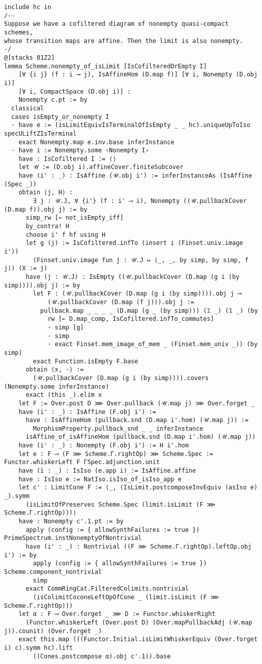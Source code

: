 \documentclass{article}
\begin{document}
\begin{lstlisting}[language=Lean, caption={AffineTransitionLimit.lean}]
include hc in
/--
Suppose we have a cofiltered diagram of nonempty quasi-compact schemes,
whose transition maps are affine. Then the limit is also nonempty.
-/
@[stacks 01Z2]
lemma Scheme.nonempty_of_isLimit [IsCofilteredOrEmpty I]
    [∀ {i j} (f : i ⟶ j), IsAffineHom (D.map f)] [∀ i, Nonempty (D.obj i)]
    [∀ i, CompactSpace (D.obj i)] :
    Nonempty c.pt := by
  classical
  cases isEmpty_or_nonempty I
  · have e := (isLimitEquivIsTerminalOfIsEmpty _ _ hc).uniqueUpToIso specULiftZIsTerminal
    exact Nonempty.map e.inv.base inferInstance
  · have i := Nonempty.some ‹Nonempty I›
    have : IsCofiltered I := ⟨⟩
    let 𝒰 := (D.obj i).affineCover.finiteSubcover
    have (i' : _) : IsAffine (𝒰.obj i') := inferInstanceAs (IsAffine (Spec _))
    obtain ⟨j, H⟩ :
        ∃ j : 𝒰.J, ∀ {i'} (f : i' ⟶ i), Nonempty ((𝒰.pullbackCover (D.map f)).obj j) := by
      simp_rw [← not_isEmpty_iff]
      by_contra! H
      choose i' f hf using H
      let g (j) := IsCofiltered.infTo (insert i (Finset.univ.image i'))
        (Finset.univ.image fun j : 𝒰.J ↦ ⟨_, _, by simp, by simp, f j⟩) (X := j)
      have (j : 𝒰.J) : IsEmpty ((𝒰.pullbackCover (D.map (g i (by simp)))).obj j) := by
        let F : (𝒰.pullbackCover (D.map (g i (by simp)))).obj j ⟶
            (𝒰.pullbackCover (D.map (f j))).obj j :=
          pullback.map _ _ _ _ (D.map (g _ (by simp))) (𝟙 _) (𝟙 _) (by
            rw [← D.map_comp, IsCofiltered.infTo_commutes]
            · simp [g]
            · simp
            · exact Finset.mem_image_of_mem _ (Finset.mem_univ _)) (by simp)
        exact Function.isEmpty F.base
      obtain ⟨x, -⟩ :=
        (𝒰.pullbackCover (D.map (g i (by simp)))).covers (Nonempty.some inferInstance)
      exact (this _).elim x
    let F := Over.post D ⋙ Over.pullback (𝒰.map j) ⋙ Over.forget _
    have (i' : _) : IsAffine (F.obj i') :=
      have : IsAffineHom (pullback.snd (D.map i'.hom) (𝒰.map j)) :=
        MorphismProperty.pullback_snd _ _ inferInstance
      isAffine_of_isAffineHom (pullback.snd (D.map i'.hom) (𝒰.map j))
    have (i' : _) : Nonempty (F.obj i') := H i'.hom
    let e : F ⟶ (F ⋙ Scheme.Γ.rightOp) ⋙ Scheme.Spec := Functor.whiskerLeft F ΓSpec.adjunction.unit
    have (i : _) : IsIso (e.app i) := IsAffine.affine
    have : IsIso e := NatIso.isIso_of_isIso_app e
    let c' : LimitCone F := ⟨_, (IsLimit.postcomposeInvEquiv (asIso e) _).symm
      (isLimitOfPreserves Scheme.Spec (limit.isLimit (F ⋙ Scheme.Γ.rightOp)))⟩
    have : Nonempty c'.1.pt := by
      apply (config := { allowSynthFailures := true }) PrimeSpectrum.instNonemptyOfNontrivial
      have (i' : _) : Nontrivial ((F ⋙ Scheme.Γ.rightOp).leftOp.obj i') := by
        apply (config := { allowSynthFailures := true }) Scheme.component_nontrivial
        simp
      exact CommRingCat.FilteredColimits.nontrivial
        (isColimitCoconeLeftOpOfCone _ (limit.isLimit (F ⋙ Scheme.Γ.rightOp)))
    let α : F ⟶ Over.forget _ ⋙ D := Functor.whiskerRight
      (Functor.whiskerLeft (Over.post D) (Over.mapPullbackAdj (𝒰.map j)).counit) (Over.forget _)
    exact this.map (((Functor.Initial.isLimitWhiskerEquiv (Over.forget i) c).symm hc).lift
        ((Cones.postcompose α).obj c'.1)).base


\end{lstlisting}
\end{document}
